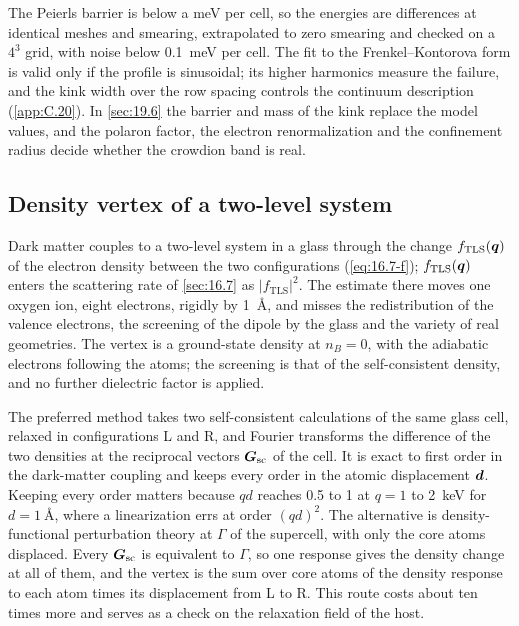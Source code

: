 The Peierls barrier is below a meV per cell, so the energies are differences at identical meshes and smearing, extrapolated to zero smearing and checked on a $4^3$ grid, with noise below \SI{0.1}{meV} per cell. The fit to the Frenkel--Kontorova form is valid only if the profile is sinusoidal; its higher harmonics measure the failure, and the kink width over the row spacing controls the continuum description (\cref{app:C.20}). In \cref{sec:19.6} the barrier and mass of the kink replace the model values, and the polaron factor, the electron renormalization and the confinement radius decide whether the crowdion band is real.

\subsection{Density vertex of a two-level system}

Dark matter couples to a two-level system in a glass through the change $f_{\mathrm{TLS}}(\bm{q})$ of the electron density between the two configurations (\cref{eq:16.7-f}); $f_{\mathrm{TLS}}(\bm{q})$ enters the scattering rate of \cref{sec:16.7} as $|f_{\mathrm{TLS}}|^2$. The estimate there moves one oxygen ion, eight electrons, rigidly by \SI{1}{\angstrom}, and misses the redistribution of the valence electrons, the screening of the dipole by the glass and the variety of real geometries. The vertex is a ground-state density at $n_B = 0$, with the adiabatic electrons following the atoms; the screening is that of the self-consistent density, and no further dielectric factor is applied.

The preferred method takes two self-consistent calculations of the same glass cell, relaxed in configurations L and R, and Fourier transforms the difference of the two densities at the reciprocal vectors $\bm{G}_{\mathrm{sc}}$ of the cell. It is exact to first order in the dark-matter coupling and keeps every order in the atomic displacement $\bm{d}$. Keeping every order matters because $qd$ reaches 0.5 to 1 at $q = 1$ to \SI{2}{keV} for $d = \SI{1}{\angstrom}$, where a linearization errs at order $(qd)^2$. The alternative is density-functional perturbation theory at $\Gamma$ of the supercell, with only the core atoms displaced. Every $\bm{G}_{\mathrm{sc}}$ is equivalent to $\Gamma$, so one response gives the density change at all of them, and the vertex is the sum over core atoms of the density response to each atom times its displacement from L to R. This route costs about ten times more and serves as a check on the relaxation field of the host.

